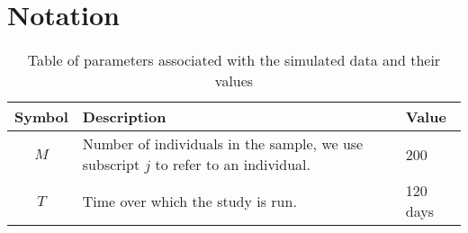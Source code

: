 
\section{Notation}

\begin{table}[H]
    \centering
    \begin{tabular}{|c|l| l| }
         \hline
        \textbf{Symbol} & \textbf{Description} & \textbf{Value}\\
        \hline
         $M$ & Number of individuals in the sample, we use subscript $j$ to refer to an individual.& 200 \\
         \hline
         $T$ & Time over which the study is run.  & 120 days \\
                  \hline
    \end{tabular}
    \caption{Table of parameters associated with the simulated data and their values}
    \label{tab:state_var}
\end{table}

